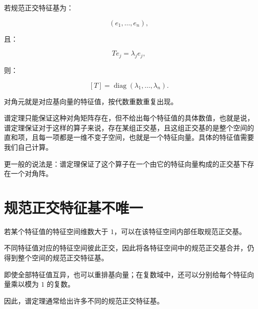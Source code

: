 若规范正交特征基为：

\[
(e_1,\ldots,e_n),
\]

且：

\[
Te_j=\lambda_je_j,
\]

则：

\[
[T]
=
\operatorname{diag}(\lambda_1,\ldots,\lambda_n).
\]

对角元就是对应基向量的特征值，按代数重数重复出现。

谱定理只能保证这种对角矩阵存在，但不给出每个特征值的具体数值，也就是说，谱定理保证对于这样的算子来说，存在某组正交基，且这组正交基的是整个空间的直和项，且每一项都是一维不变子空间，也就是一个特征向量。具体的特征值需要我们自己计算。

更一般的说法是：谱定理保证了这个算子在一个由它的特征向量构成的正交基下存在一个对角阵。

\section{规范正交特征基不唯一}

若某个特征值的特征空间维数大于 $1$，可以在该特征空间内部任取规范正交基。

不同特征值对应的特征空间彼此正交，因此将各特征空间中的规范正交基合并，仍得到整个空间的规范正交特征基。

即使全部特征值互异，也可以重排基向量；在复数域中，还可以分别给每个特征向量乘以模为 $1$ 的复数。

因此，谱定理通常给出许多不同的规范正交特征基。
